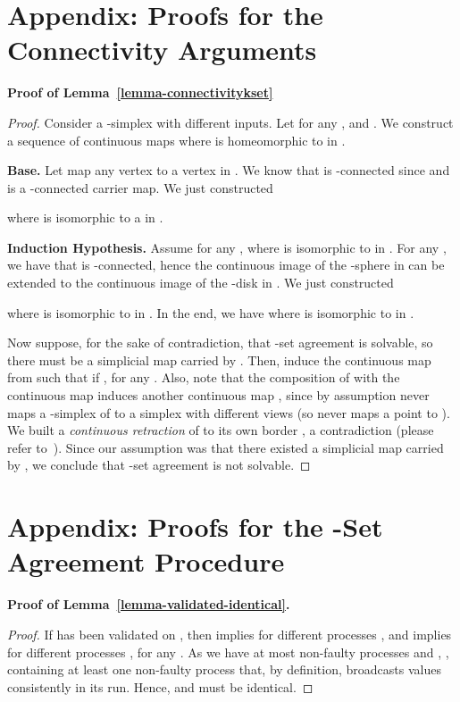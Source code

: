 \documentclass[11pt]{article}
\begin{document}
\newpage

\appendix

\section{Appendix: Proofs for the Connectivity Arguments}
\label{App-ProofsConnectivity}

\noindent \textbf{Proof of Lemma~\ref{lemma-connectivitykset}}
\begin{proof}
Consider a -simplex  with  different inputs.
Let  for any ,
and .
We construct a sequence of continuous maps 
where  is homeomorphic to  in .

\textbf{Base.} Let  map any vertex  to a vertex in .
We know that  is -connected since  and  is a -connected carrier map.
We just constructed

where  is isomorphic to a  in .

\textbf{Induction Hypothesis.} Assume  for any ,
where  is isomorphic to  in . 
For any ,
we have that  is -connected,
hence the continuous image of the -sphere in 
can be extended to the continuous image of the -disk in .
We just constructed

where  is isomorphic to  in .
In the end,
we have  where  is isomorphic to  in .

Now suppose,
for the sake of contradiction,
that -set agreement is solvable,
so there must be a simplicial map  carried by .
Then,
induce the continuous map  from  such that
 if ,
for any .
Also,
note that the composition of  with the continuous map 
induces another continuous map ,
since by assumption  never maps a -simplex of  to a simplex with  different views
(so  never maps a point to ).
We built a \emph{continuous retraction} of  to its own border ,
a contradiction (please refer to~\cite{Munkres84,Kozlov07}).
Since our assumption was that there existed
a simplicial map  carried by ,
we conclude that -set agreement is not solvable.
\end{proof}

\section{Appendix: Proofs for the -Set Agreement Procedure}
\label{App-ProofsAlgorithm}

\noindent \textbf{Proof of Lemma~\ref{lemma-validated-identical}.}
\begin{proof}
If  has been validated on ,
then  implies  for  different processes ,
and  implies  for  different processes ,
for any .
As we have at most  non-faulty processes and ,
,
containing at least one non-faulty process that,
by definition,
broadcasts values consistently in its run.
Hence,  and  must be identical.
\end{proof}
\end{document}
